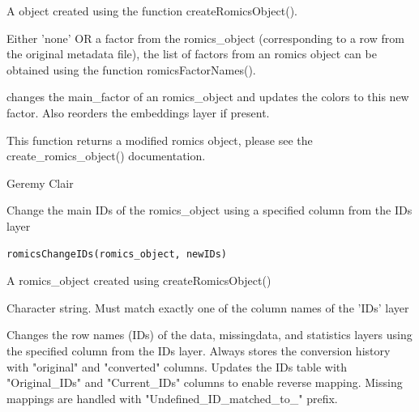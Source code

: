 \documentclass[a4paper]{book}
\begin{document}
%
\begin{Arguments}
\begin{ldescription}
\item[\code{romics\_object}] A object created using the function createRomicsObject().

\item[\code{main\_factor}] Either 'none' OR a factor from the romics\_object (corresponding to a row from the original metadata file), the list of factors from an romics object can be obtained using the function romicsFactorNames().
\end{ldescription}
\end{Arguments}
%
\begin{Details}
changes the main\_factor of an romics\_object and updates the colors to this new factor. Also reorders the embeddings layer if present.
\end{Details}
%
\begin{Value}
This function returns a modified romics object, please see the create\_romics\_object() documentation.
\end{Value}
%
\begin{Author}
Geremy Clair
\end{Author}
%
\begin{Description}
Change the main IDs of the romics\_object using a specified column from the IDs layer
\end{Description}
%
\begin{Usage}
\begin{verbatim}
romicsChangeIDs(romics_object, newIDs)
\end{verbatim}
\end{Usage}
%
\begin{Arguments}
\begin{ldescription}
\item[\code{romics\_object}] A romics\_object created using createRomicsObject()

\item[\code{newIDs}] Character string. Must match exactly one of the column names of the 'IDs' layer
\end{ldescription}
\end{Arguments}
%
\begin{Details}
Changes the row names (IDs) of the data, missingdata, and statistics layers using the specified column
from the IDs layer. Always stores the conversion history with "original" and "converted" columns.
Updates the IDs table with "Original\_IDs" and "Current\_IDs" columns to enable reverse mapping.
Missing mappings are handled with "Undefined\_ID\_matched\_to\_" prefix.
\end{Details}
\end{document}
